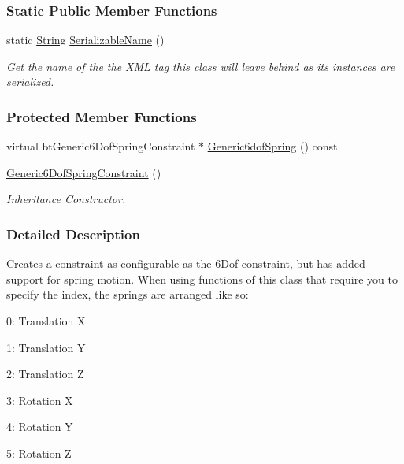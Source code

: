 \subsubsection*{Static Public Member Functions}
\begin{DoxyCompactItemize}
\item 
static \hyperlink{namespacephys_aa03900411993de7fbfec4789bc1d392e}{String} \hyperlink{classphys_1_1Generic6DofSpringConstraint_a574901d1abc3163c23dc1a165c8fbdaa}{SerializableName} ()
\begin{DoxyCompactList}\small\item\em Get the name of the the XML tag this class will leave behind as its instances are serialized. \item\end{DoxyCompactList}\end{DoxyCompactItemize}
\subsubsection*{Protected Member Functions}
\begin{DoxyCompactItemize}
\item 
virtual btGeneric6DofSpringConstraint $\ast$ \hyperlink{classphys_1_1Generic6DofSpringConstraint_a9b8621e2f9cd34fe183de6e664959027}{Generic6dofSpring} () const 
\item 
\hyperlink{classphys_1_1Generic6DofSpringConstraint_aeca02121a3d7d2416a611c2f7274c1a6}{Generic6DofSpringConstraint} ()
\begin{DoxyCompactList}\small\item\em Inheritance Constructor. \item\end{DoxyCompactList}\end{DoxyCompactItemize}


\subsubsection{Detailed Description}
Creates a constraint as configurable as the 6Dof constraint, but has added support for spring motion. When using functions of this class that require you to specify the index, the springs are arranged like so: \par

\begin{DoxyItemize}
\item 0: Translation X
\item 1: Translation Y
\item 2: Translation Z
\item 3: Rotation X
\item 4: Rotation Y
\item 5: Rotation Z 
\end{DoxyItemize}

